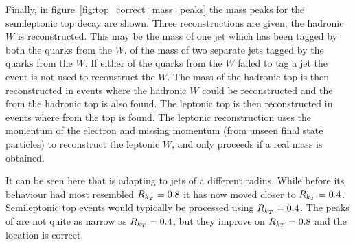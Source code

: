 Finally, in figure~\ref{fig:top_correct_mass_peaks} the mass peaks for the semileptonic top decay are shown.
Three reconstructions are given; the hadronic \(W\) is reconstructed.
This may be the mass of one jet which has been tagged by both the quarks from the \(W\),
of the mass of two separate jets tagged by the quarks from the \(W\).
If either of the quarks from the \(W\) failed to tag a jet the event is not used to reconstruct the \(W\).
The mass of the hadronic top is then reconstructed in events where the hadronic \(W\) could be reconstructed and the 
from the hadronic top is also found.
The leptonic top is then reconstructed in events where  from the top is found.
The leptonic reconstruction uses the momentum of the electron and missing momentum (from unseen final state particles)
to reconstruct the leptonic \(W\), and only proceeds if a real mass is obtained.

It can be seen here that \spectral{} is adapting to jets of a different radius.
While before its behaviour had most resembled \(R_{k_T}{} = 0.8\)
it has now moved closer to \(R_{k_T}{} = 0.4\).
Semileptonic top events would typically be processed using \(R_{k_T}{} = 0.4\).
The peaks of \spectral{} are not quite as narrow as \(R_{k_T}{} = 0.4\),
but they improve on \(R_{k_T}{} = 0.8\) and the location is correct.

%



